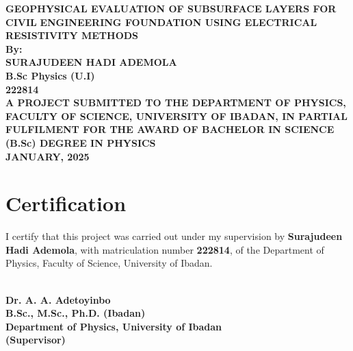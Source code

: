 \documentclass[12pt,a4paper]{report}
\begin{document}
\begin{titlepage}
    \begin{center}
        \large\textbf{GEOPHYSICAL EVALUATION OF SUBSURFACE LAYERS FOR CIVIL}
        \large\textbf{ENGINEERING FOUNDATION USING ELECTRICAL RESISTIVITY METHODS} \\[6.0cm]
        
        \textbf{By:} \\[0.2cm]
        
        \Large\textbf{SURAJUDEEN HADI ADEMOLA} \\[0.1cm]
        \Large\textbf{B.Sc Physics (U.I)} \\[0.1cm]
        \Large\textbf{222814} \\[5.3cm]
        
        \large\textbf{A PROJECT SUBMITTED TO THE DEPARTMENT OF PHYSICS, FACULTY OF SCIENCE,
        UNIVERSITY OF IBADAN, IN PARTIAL FULFILMENT FOR THE AWARD OF BACHELOR IN SCIENCE (B.Sc)
        DEGREE IN PHYSICS} \\[4cm]
        
        \textbf{JANUARY, 2025}
    \end{center}
\end{titlepage}


\chapter*{Certification}
\justifying  
I certify that this project was carried out under my supervision by \textbf{Surajudeen Hadi Ademola}, with matriculation number \textbf{222814}, of the Department of Physics, Faculty of Science, University of Ibadan.

\vspace{5cm}  

\begin{center}
    \noindent\makebox[7cm]{\hrulefill}  \\  
    \textbf{Dr. A. A. Adetoyinbo}  \\  
    \textbf{B.Sc., M.Sc., Ph.D. (Ibadan)}  \\  
    \textbf{Department of Physics, University of Ibadan}  \\  
    \textbf{(Supervisor)}  
\end{center}

\vspace{3cm}
\end{document}
